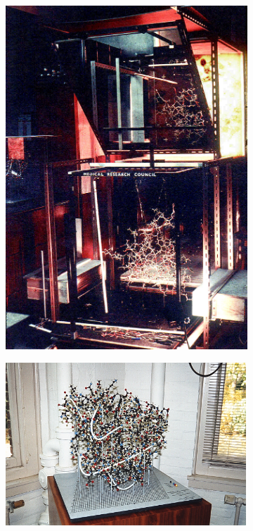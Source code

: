 \begin{figure}
\begin{subfigure}{.5\textwidth}
    \label{Fig:kendrew_myoglobin_forest_of_rods}
  \caption{}
  \hspace{0.3cm}
  \end{subfigure}%
  \\[\baselineskip]
  \begin{subfigure}{.5\textwidth}
  \centering
  {\includegraphics[width=0.9\linewidth]{./figures/ch1/fred_richards_ribonuclease}}
  \caption{}
    \label{Fig:fred_richards_ribonuclease}
  \hspace{0.3cm}
  \end{subfigure}%
  \begin{subfigure}{.5\textwidth}
  \centering
  {\includegraphics[width=0.9\linewidth]{./figures/ch1/kendrew_myoglobin_ball_and_spokes}}

\end{subfigure}
\end{figure}
